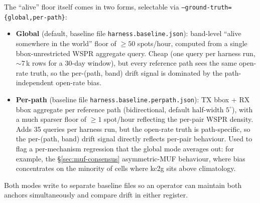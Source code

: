 \documentclass[11pt,a4paper]{article}
\begin{document}
The ``alive'' floor itself comes in two forms, selectable via
\texttt{--ground-truth=\{global,per-path\}}:
\begin{itemize}[nosep]
  \item \textbf{Global} (default, baseline file
    \texttt{harness.baseline.json}):
    band-level ``alive somewhere in the world'' floor of $\geq 50$
    spots/hour, computed from a single bbox-unrestricted WSPR
    aggregate query.  Cheap (one query per harness run, $\sim$7\,k
    rows for a 30-day window), but every reference path sees the same
    open-rate truth, so the per-(path, band) drift signal is
    dominated by the path-independent open-rate bias.
  \item \textbf{Per-path}\label{sec:perpath} (baseline file
    \texttt{harness.baseline.perpath.json}): TX bbox + RX bbox
    aggregate per reference path (bidirectional, default half-width
    $5^\circ$), with a much sparser floor of $\geq 1$ spot/hour
    reflecting the per-pair WSPR density.  Adds 35 queries per
    harness run, but the open-rate truth is path-specific, so the
    per-(path, band) drift signal directly reflects per-pair
    behaviour.  Used to flag a per-mechanism regression that the
    global mode averages out: for example, the \S\ref{sec:muf-consensus}
    asymmetric-MUF behaviour, where bias concentrates on the
    minority of cells where kc2g sits above climatology.
\end{itemize}
Both modes write to separate baseline files so an operator can
maintain both anchors simultaneously and compare drift in either
register.
\end{document}
